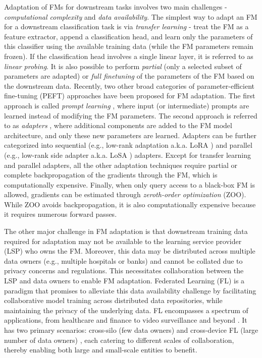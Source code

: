 Adaptation of FMs for downstream tasks involves two main challenges - \textit{computational complexity} and \textit{data availability}. The simplest way to adapt an FM for a downstream classification task is via \textit{transfer learning} - treat the FM as a feature extractor, append a classification head, and learn only the parameters of this classifier using the available training data (while the FM parameters remain frozen). If the classification head involves a single linear layer, it is referred to as \textit{linear probing}. It is also possible to perform \textit{partial} (only a selected subset of parameters are adapted) or \textit{full finetuning} of the parameters of the FM based on the downstream data. Recently, two other broad categories of parameter-efficient fine-tuning (PEFT) approaches have been proposed for FM adaptation. The first approach is called \textit{prompt learning} \cite{jia2022visual}, where input (or intermediate) prompts are learned instead of modifying the FM parameters. The second approach is referred to as \textit{adapters} \cite{hu2021lora,dettmers2023qlora,mercea2024time}, where additional components are added to the FM model architecture, and only these new parameters are learned. Adapters can be further categorized into sequential (e.g., low-rank adaptation a.k.a. LoRA \cite{hu2021lora}) and parallel (e.g., low-rank side adapter a.k.a. LoSA \cite{mercea2024time}) adapters. Except for transfer learning and parallel adapters, all the other adaptation techniques require partial or complete backpropagation of the gradients through the FM, which is computationally expensive. Finally, when only query access to a black-box FM is allowed, gradients can be estimated through \textit{zeroth-order optimization} (ZOO). While ZOO avoids backpropagation, it is also computationally expensive because it requires numerous forward passes. 

The other major challenge in FM adaptation is that downstream training data required for adaptation may not be available to the learning service provider (LSP) who owns the FM. Moreover, this data may be distributed across multiple data owners (e.g., multiple hospitals or banks) and cannot be collated due to privacy concerns and regulations. This necessitates collaboration between the LSP and data owners to enable FM adaptation. Federated Learning (FL) \cite{mcmahan2017communication} is a paradigm that promises to alleviate this data availability challenge by facilitating collaborative model training across distributed data repositories, while maintaining the privacy of the underlying data. FL encompasses a spectrum of applications, from healthcare \cite{antunes2022federated, xu2021federated} and finance \cite{long2020federated, liu2023efficient} to video surveillance \cite{sugianto2024collaborative} and beyond \cite{ghimire2022recent}. It has two primary scenarios: cross-silo (few data owners) and cross-device FL (large number of data owners) \cite{kairouz2021advances}, each catering to different scales of collaboration, thereby enabling both large and small-scale entities to benefit. 


